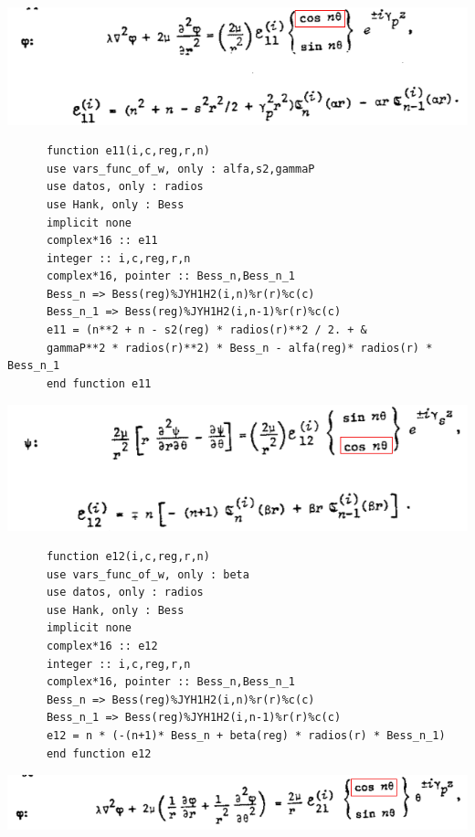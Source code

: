 \documentclass [11pt,spanish]{article}
\begin{document}
\endgroup
\includegraphics[scale=0.5]{e11}
\begingroup
\fontsize{10pt}{12pt}
\selectfont
{}
\begin{shaded}
\begin{verbatim}
      function e11(i,c,reg,r,n)
      use vars_func_of_w, only : alfa,s2,gammaP
      use datos, only : radios
      use Hank, only : Bess
      implicit none
      complex*16 :: e11
      integer :: i,c,reg,r,n
      complex*16, pointer :: Bess_n,Bess_n_1
      Bess_n => Bess(reg)%JYH1H2(i,n)%r(r)%c(c)
      Bess_n_1 => Bess(reg)%JYH1H2(i,n-1)%r(r)%c(c)
      e11 = (n**2 + n - s2(reg) * radios(r)**2 / 2. + & 
      gammaP**2 * radios(r)**2) * Bess_n - alfa(reg)* radios(r) * Bess_n_1
      end function e11
\end{verbatim}
\end{shaded}
\endgroup
\includegraphics[scale=0.5]{e12}
\begingroup
\fontsize{10pt}{12pt}
\selectfont
{}
\begin{shaded}
\begin{verbatim}
      function e12(i,c,reg,r,n)
      use vars_func_of_w, only : beta
      use datos, only : radios
      use Hank, only : Bess
      implicit none
      complex*16 :: e12
      integer :: i,c,reg,r,n
      complex*16, pointer :: Bess_n,Bess_n_1
      Bess_n => Bess(reg)%JYH1H2(i,n)%r(r)%c(c)
      Bess_n_1 => Bess(reg)%JYH1H2(i,n-1)%r(r)%c(c)
      e12 = n * (-(n+1)* Bess_n + beta(reg) * radios(r) * Bess_n_1)
      end function e12
\end{verbatim}
\end{shaded}
\endgroup
\includegraphics[scale=0.5]{e21a}
\end{document}
